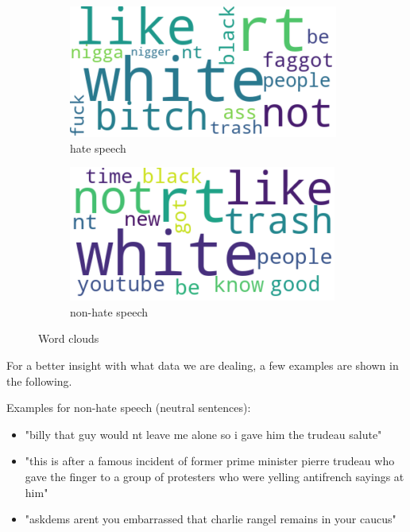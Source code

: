 \begin{figure}[ht]
    \hfill
    \begin{subfigure}[b]{0.4\textwidth}
        \centering
        \includegraphics[width=\textwidth]{figures/Wordcloud-HateSpeech-tokens.png}
        \caption{hate speech}
    \end{subfigure}
    \hfill
    \begin{subfigure}[b]{0.4\textwidth}
        \centering
        \includegraphics[width=\textwidth]{figures/Wordcloud-Non-HateSpeech-tokens.png}
        \caption{non-hate speech}
    \end{subfigure}
    \hfill
    \caption{Word clouds}
    \label{fig:wordclouds}
\end{figure}

For a better insight with what data we are dealing, a few examples are shown in the following.

\noindent
Examples for non-hate speech (neutral sentences):
\begin{itemize}
    \item "billy that guy would nt leave me alone so i gave him the trudeau salute"
    \item "this is after a famous incident of former prime minister pierre trudeau who gave the finger to a group of protesters who were yelling antifrench sayings at him"
    \item "askdems arent you embarrassed that charlie rangel remains in your caucus"
\end{itemize}


